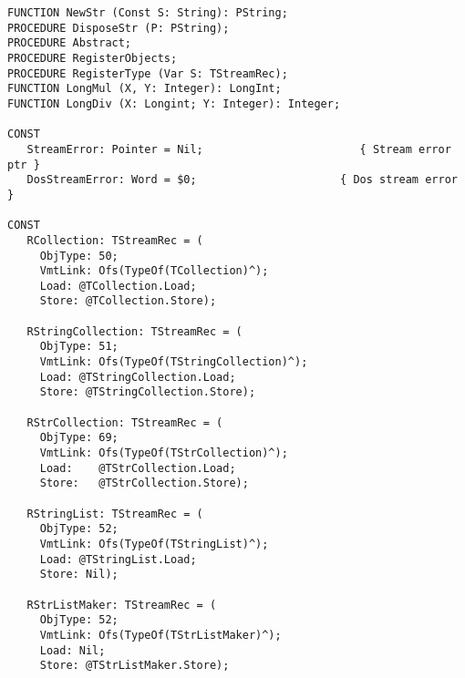 \begin{verbatim}
FUNCTION NewStr (Const S: String): PString;
PROCEDURE DisposeStr (P: PString);
PROCEDURE Abstract;
PROCEDURE RegisterObjects;
PROCEDURE RegisterType (Var S: TStreamRec);
FUNCTION LongMul (X, Y: Integer): LongInt;
FUNCTION LongDiv (X: Longint; Y: Integer): Integer;

CONST
   StreamError: Pointer = Nil;                        { Stream error ptr }
   DosStreamError: Word = $0;                      { Dos stream error }

CONST
   RCollection: TStreamRec = (
     ObjType: 50;
     VmtLink: Ofs(TypeOf(TCollection)^);
     Load: @TCollection.Load;
     Store: @TCollection.Store);

   RStringCollection: TStreamRec = (
     ObjType: 51;
     VmtLink: Ofs(TypeOf(TStringCollection)^);
     Load: @TStringCollection.Load;
     Store: @TStringCollection.Store);

   RStrCollection: TStreamRec = (
     ObjType: 69;
     VmtLink: Ofs(TypeOf(TStrCollection)^);
     Load:    @TStrCollection.Load;
     Store:   @TStrCollection.Store);

   RStringList: TStreamRec = (
     ObjType: 52;
     VmtLink: Ofs(TypeOf(TStringList)^);
     Load: @TStringList.Load;
     Store: Nil);

   RStrListMaker: TStreamRec = (
     ObjType: 52;
     VmtLink: Ofs(TypeOf(TStrListMaker)^);
     Load: Nil;
     Store: @TStrListMaker.Store);
\end{verbatim}